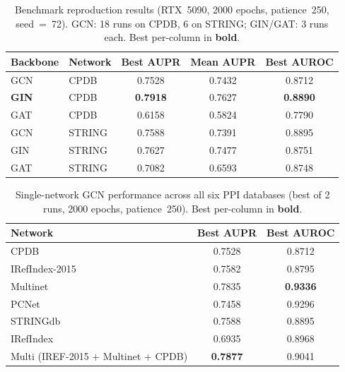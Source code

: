 \begin{table}[ht]
  \centering
  \caption{Benchmark reproduction results (RTX~5090, 2000 epochs, patience~250,
           seed~=~72). GCN: 18 runs on CPDB, 6 on STRING; GIN/GAT: 3 runs each.
           Best per-column in \textbf{bold}.}
  \label{tab:benchmark}
  \small
  \begin{tabular}{llccc}
    \toprule
    \textbf{Backbone} & \textbf{Network} & \textbf{Best AUPR} & \textbf{Mean AUPR} & \textbf{Best AUROC} \\
    \midrule
    GCN          & CPDB   & 0.7528          & 0.7432          & 0.8712          \\
    \textbf{GIN} & CPDB   & \textbf{0.7918} & 0.7627          & \textbf{0.8890} \\
    GAT          & CPDB   & 0.6158          & 0.5824          & 0.7790          \\
    \midrule
    GCN          & STRING & 0.7588          & 0.7391          & 0.8895          \\
    GIN          & STRING & 0.7627          & 0.7477          & 0.8751          \\
    GAT          & STRING & 0.7082          & 0.6593          & 0.8748          \\
    \bottomrule
  \end{tabular}
\end{table}

\begin{table}[ht]
  \centering
  \caption{Single-network GCN performance across all six PPI databases (best of 2 runs,
           2000 epochs, patience~250). Best per-column in \textbf{bold}.}
  \label{tab:pernetwork}
  \small
  \begin{tabular}{lcc}
    \toprule
    \textbf{Network} & \textbf{Best AUPR} & \textbf{Best AUROC} \\
    \midrule
    CPDB            & 0.7528          & 0.8712 \\
    IRefIndex-2015  & 0.7582          & 0.8795 \\
    Multinet        & 0.7835          & \textbf{0.9336} \\
    PCNet           & 0.7458          & 0.9296 \\
    STRINGdb        & 0.7588          & 0.8895 \\
    IRefIndex       & 0.6935          & 0.8968 \\
    \midrule
    Multi (IREF-2015 + Multinet + CPDB) & \textbf{0.7877} & 0.9041 \\
    \bottomrule
  \end{tabular}
\end{table}

